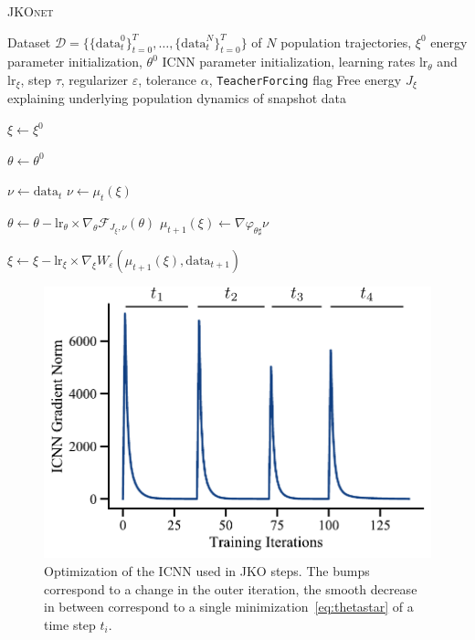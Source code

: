 \begin{algorithm}[t]
\caption{\textsc{JKOnet}}
\label{algo:jkonet}
\begin{algorithmic}


    Dataset $\mathcal{D}=\{\{\mathrm{data}_t^0 \}_{t=0}^T, \ldots, \{\mathrm{data}_t^N \}_{t=0}^T\}$ of $N$ population trajectories, $\xi^0$ energy parameter initialization, $\theta^0$ ICNN parameter initialization, learning rates $\text{lr}_\theta$ and $\text{lr}_\xi$, step $\tau$, regularizer $\varepsilon$, tolerance $\alpha$, {\texttt{TeacherForcing}} flag
    Free energy $J_{\xi}$ explaining underlying population dynamics of snapshot data
   \smallskip
   
   \STATE $\xi\leftarrow \xi^0$

   \STATE $\theta\leftarrow \theta^0$

    \STATE $\nu \leftarrow \mathrm{data}_t$
   \ELSE
   \STATE $\nu \leftarrow \mu_t(\xi)$
   \ENDIF
    
   \STATE $\theta \leftarrow \theta - \text{lr}_\theta \times \nabla_\theta \mathcal{F}_{J_\xi,\nu}(\theta)$
   \ENDWHILE
   \STATE $\mu_{t+1}(\xi) \leftarrow \nabla \varphi_{\theta \sharp} \nu$

   \STATE $\xi \leftarrow \xi - \text{lr}_\xi \times \nabla_\xi W_\varepsilon(\mu_{t+1}(\xi), \mathrm{data}_{t+1})$
   \ENDFOR
   \ENDFOR
	
\end{algorithmic}
\end{algorithm}

\begin{figure}
    \centering
    \includegraphics[width=\textwidth]{figures/fig_optimization_icnn.pdf}
    \caption{Optimization of the ICNN used in \acrshort{JKO} steps. The bumps correspond to a change in the outer iteration, the smooth decrease in between correspond to a single minimization~\eqref{eq:thetastar} of a time step $t_i$. }
    \label{fig:training_icnn}
\end{figure}

